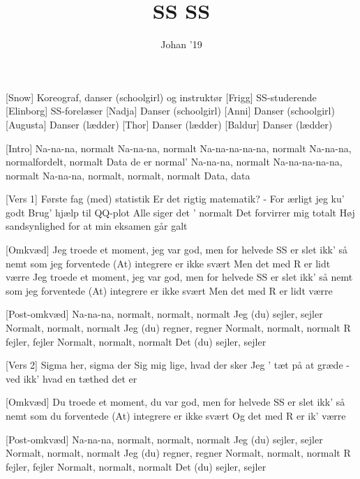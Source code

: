 \documentclass[a4paper,11pt]{article}
\title{SS SS}
\author{Johan '19}
\begin{document}
\maketitle

\begin{roles}
[Snow] Koreograf, danser (schoolgirl) og instruktør
[Frigg] SS-studerende
[Elinborg] SS-forelæser
[Nadja] Danser (schoolgirl)
[Anni] Danser (schoolgirl)
[Augusta] Danser (lædder)
[Thor] Danser (lædder)
[Baldur] Danser (lædder)
\end{roles}

\begin{song}

  [Intro] Na-na-na, normalt
Na-na-na, normalt
Na-na-na-na-na, normalt
Na-na-na, normalfordelt, normalt
Data de er normal’
Na-na-na, normalt
Na-na-na-na-na, normalt
Na-na-na, normalt, normalt, normalt
Data, data

  [Vers 1] Første fag (med) statistik
Er det rigtig matematik?
- For ærligt jeg ku' godt
Brug' hjælp til QQ-plot
Alle siger det ’ normalt
Det forvirrer mig totalt
Høj sandsynlighed for at min eksamen går galt

   [Omkvæd]  Jeg troede et moment, jeg var god, men for helvede
SS er slet ikk’ så nemt som jeg forventede
(At) integrere er ikke svært
Men det med R er lidt værre
Jeg troede et moment, jeg var god, men for helvede
SS er slet ikk’ så nemt som jeg forventede
(At) integrere er ikke svært
Men det med R er lidt værre

 [Post-omkvæd] Na-na-na, normalt, normalt, normalt
Jeg (du) sejler, sejler
Normalt, normalt, normalt
Jeg (du) regner, regner
Normalt, normalt, normalt
R fejler, fejler
Normalt, normalt, normalt
Det (du) sejler, sejler

[Vers 2] Sigma her, sigma der
Sig mig lige, hvad der sker
Jeg ’ tæt på at græde - ved ikk’ hvad en tæthed det er

  [Omkvæd] Du troede et moment, du var god, men for helvede
SS er slet ikk’ så nemt som du forventede
(At) integrere er ikke svært
Og det med R er ik' værre

 [Post-omkvæd] Na-na-na, normalt, normalt, normalt
Jeg (du) sejler, sejler
Normalt, normalt, normalt
Jeg (du) regner, regner
Normalt, normalt, normalt
R fejler, fejler
Normalt, normalt, normalt
Det (du) sejler, sejler
 

\end{song}
\end{document}
